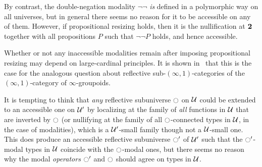 \begin{eg}
  By contrast, the double-negation modality $\neg\neg$ \emph{is} defined in a polymorphic way on all universes, but in general there seems no reason for it to be accessible on any of them.
  However, if propositional resizing holds, then it is the nullification at $\mathbf{2}$ together with all propositions $P$ such that $\neg\neg P$ holds, and hence accessible.

  Whether or not any inaccessible modalities remain after imposing propositional resizing may depend on large-cardinal principles.
  It is shown in~\cite{css:large-cardinal} that this is the case for the analogous question about reflective sub-$(\infty,1)$-categories of the $(\infty,1)$-category of $\infty$-groupoids.
\end{eg}

\begin{rmk}\label{rmk:extend-oops}
  It is tempting to think that \emph{any} reflective subuniverse ${\ocircle}$ on $\mathcal{U}$ could be extended to an accessible one on $\mathcal{U}'$ by localizing at the family of \emph{all} functions in $\mathcal{U}$ that are inverted by ${\ocircle}$ (or nullifying at the family of all ${\ocircle}$-connected types in $\mathcal{U}$, in the case of modalities), which is a $\mathcal{U}'$-small family though not a $\mathcal{U}$-small one.
  This does produce an accessible reflective subuniverse ${\ocircle}'$ of $\mathcal{U}'$ such that the ${\ocircle}'$-modal types in $\mathcal{U}$ coincide with the ${\ocircle}$-modal ones, but there seems no reason why the modal \emph{operators} ${\ocircle}'$ and ${\ocircle}$ should agree on types in $\mathcal{U}$.
\end{rmk}

\endinput
\section{Left exact modalities}\label{sec:left-exact-modal}

We have seen that the modal operator of any reflective subuniverse preserves products, but even for a modality it does not generally preserve pullbacks.
If it does, we call the modality ``left exact'' or just ``lex''.


